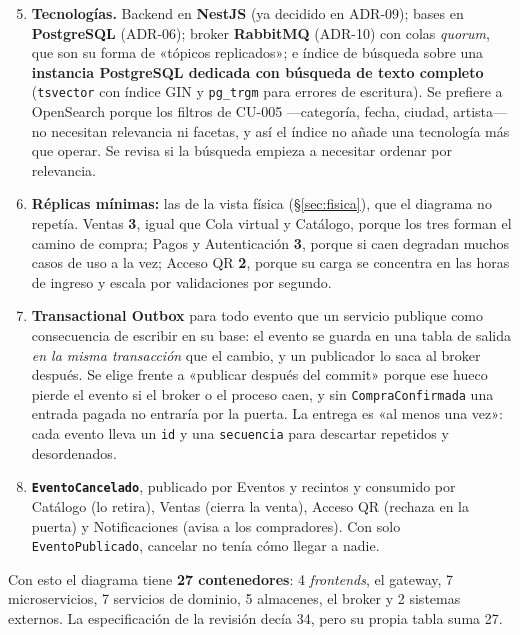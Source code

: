 \begin{enumerate}
  \setcounter{enumi}{4}
  \item \textbf{Tecnologías.} Backend en \textbf{NestJS} (ya decidido en ADR-09);
        bases en \textbf{PostgreSQL} (ADR-06); broker \textbf{RabbitMQ} (ADR-10)
        con colas \textit{quorum}, que son su forma de «tópicos replicados»; e
        índice de búsqueda sobre una \textbf{instancia PostgreSQL dedicada con
        búsqueda de texto completo} (\texttt{tsvector} con índice GIN y
        \texttt{pg\_trgm} para errores de escritura). Se prefiere a OpenSearch
        porque los filtros de CU-005 ---categoría, fecha, ciudad, artista--- no
        necesitan relevancia ni facetas, y así el índice no añade una
        tecnología más que operar. Se revisa si la búsqueda empieza a necesitar
        ordenar por relevancia.
  \item \textbf{Réplicas mínimas:} las de la vista física
        (§\ref{sec:fisica}), que el diagrama no repetía. Ventas \textbf{3},
        igual que Cola virtual y Catálogo, porque los tres forman el camino de
        compra; Pagos y Autenticación \textbf{3}, porque si caen degradan muchos
        casos de uso a la vez; Acceso QR \textbf{2}, porque su carga se
        concentra en las horas de ingreso y escala por validaciones por segundo.
  \item \textbf{Transactional Outbox} para todo evento que un servicio publique
        como consecuencia de escribir en su base: el evento se guarda en una
        tabla de salida \textit{en la misma transacción} que el cambio, y un
        publicador lo saca al broker después. Se elige frente a «publicar
        después del commit» porque ese hueco pierde el evento si el broker o el
        proceso caen, y sin \texttt{CompraConfirmada} una entrada pagada no
        entraría por la puerta. La entrega es «al menos una vez»: cada evento
        lleva un \texttt{id} y una \texttt{secuencia} para descartar repetidos y
        desordenados.
  \item \textbf{\texttt{EventoCancelado}}, publicado por Eventos y recintos y
        consumido por Catálogo (lo retira), Ventas (cierra la venta), Acceso QR
        (rechaza en la puerta) y Notificaciones (avisa a los compradores). Con
        solo \texttt{EventoPublicado}, cancelar no tenía cómo llegar a nadie.
\end{enumerate}

Con esto el diagrama tiene \textbf{27 contenedores}: 4 \textit{frontends}, el
gateway, 7 microservicios, 7 servicios de dominio, 5 almacenes, el broker y 2
sistemas externos. La especificación de la revisión decía 34, pero su propia
tabla suma 27.

